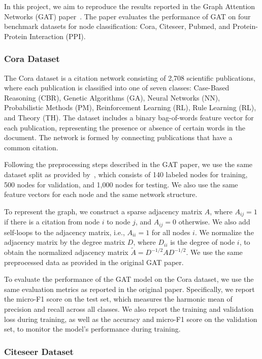 In this project, we aim to reproduce the results reported in the Graph Attention Networks (GAT) paper~\cite{velickovic2018graph}.
The paper evaluates the performance of GAT on four benchmark datasets for node classification: Cora, Citeseer, Pubmed, and Protein-Protein Interaction (PPI).

\subsubsection{Cora Dataset}\label{subsubsec:cora-dataset}

The Cora dataset is a citation network consisting of 2,708 scientific publications, where each publication is classified into one of seven classes: Case-Based Reasoning (CBR), Genetic Algorithms (GA), Neural Networks (NN), Probabilistic Methods (PM), Reinforcement Learning (RL), Rule Learning (RL), and Theory (TH).
The dataset includes a binary bag-of-words feature vector for each publication, representing the presence or absence of certain words in the document.
The network is formed by connecting publications that have a common citation.

Following the preprocessing steps described in the GAT paper, we use the same dataset split as provided by~\cite{sen2008collective}, which consists of 140 labeled nodes for training, 500 nodes for validation, and 1,000 nodes for testing.
We also use the same feature vectors for each node and the same network structure.

To represent the graph, we construct a sparse adjacency matrix $A$, where $A_{ij}=1$ if there is a citation from node $i$ to node $j$, and $A_{ij}=0$ otherwise.
We also add self-loops to the adjacency matrix, i.e., $A_{ii}=1$ for all nodes $i$.
We normalize the adjacency matrix by the degree matrix $D$, where $D_{ii}$ is the degree of node $i$, to obtain the normalized adjacency matrix $\tilde{A}=D^{-1/2}AD^{-1/2}$.
We use the same preprocessed data as provided in the original GAT paper.

To evaluate the performance of the GAT model on the Cora dataset, we use the same evaluation metrics as reported in the original paper.
Specifically, we report the micro-F1 score on the test set, which measures the harmonic mean of precision and recall across all classes.
We also report the training and validation loss during training, as well as the accuracy and micro-F1 score on the validation set, to monitor the model's performance during training.

\subsubsection{Citeseer Dataset}\label{subsubsec:citeseer-dataset}

